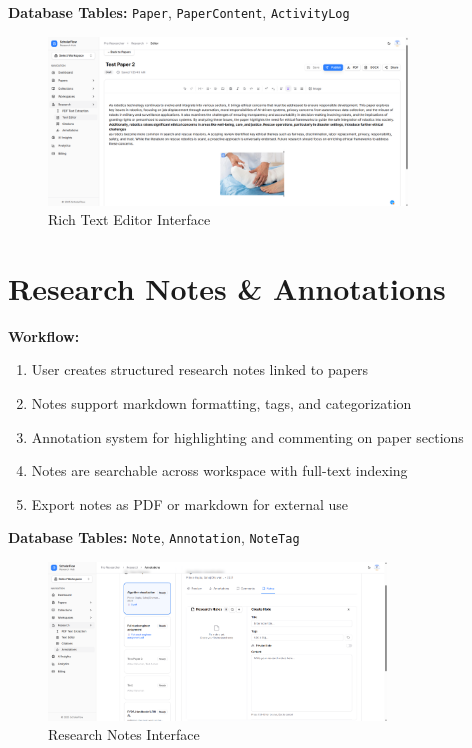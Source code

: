 \textbf{Database Tables:} \texttt{Paper}, \texttt{PaperContent}, \texttt{ActivityLog}

\begin{figure}[H]
\centering
\includegraphics[width=0.85\textwidth]{images/screenshots/text_editor.png}
\caption{Rich Text Editor Interface}
\label{fig:editor}
\end{figure}

\section{Research Notes \& Annotations}

\textbf{Workflow:}
\begin{enumerate}[leftmargin=*,topsep=3pt,itemsep=2pt]
    \item User creates structured research notes linked to papers
    \item Notes support markdown formatting, tags, and categorization
    \item Annotation system for highlighting and commenting on paper sections
    \item Notes are searchable across workspace with full-text indexing
    \item Export notes as PDF or markdown for external use
\end{enumerate}

\textbf{Database Tables:} \texttt{Note}, \texttt{Annotation}, \texttt{NoteTag}

\begin{figure}[H]
\centering
\includegraphics[width=0.8\textwidth]{images/screenshots/research_notes.png}
\caption{Research Notes Interface}
\label{fig:notes}
\end{figure}

